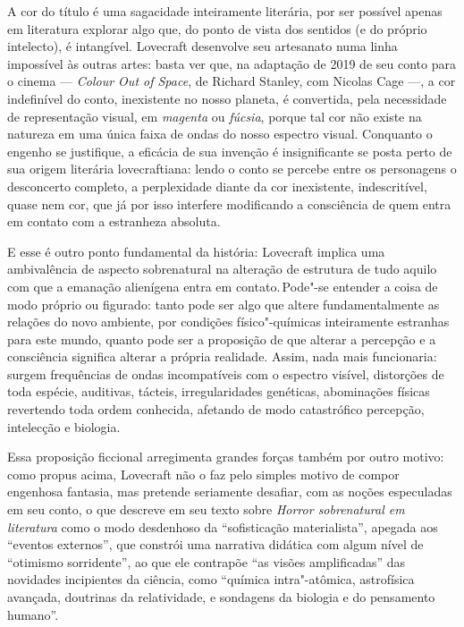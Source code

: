 A cor do título é uma sagacidade inteiramente literária, por ser
possível apenas em literatura explorar algo que, do ponto de vista dos
sentidos (e do próprio intelecto), é intangível. Lovecraft desenvolve
seu artesanato numa linha impossível às outras artes: basta ver que, na
adaptação de 2019 de seu conto para o cinema --- \textit{Colour Out of
Space}, de Richard Stanley, com Nicolas Cage ---, a cor indefinível do
conto, inexistente no nosso planeta, é convertida, pela necessidade de
representação visual, em \textit{magenta} ou \textit{fúcsia}, porque tal cor
não existe na natureza em uma única faixa de ondas do nosso espectro
visual. Conquanto o engenho se justifique, a eficácia de sua invenção é
insignificante se posta perto de sua origem literária lovecraftiana:
lendo o conto se percebe entre os personagens o desconcerto completo, a
perplexidade diante da cor inexistente, indescritível, quase nem cor,
que já por isso interfere modificando a consciência de quem entra em
contato com a estranheza absoluta.

E esse é outro ponto fundamental da história: Lovecraft implica uma
ambivalência de aspecto sobrenatural na alteração de estrutura de tudo
aquilo com que a emanação alienígena entra em contato.\,Pode"-se entender
a coisa de modo próprio ou figurado: tanto pode ser algo que altere
fundamentalmente as relações do novo ambiente, por condições
físico"-químicas inteiramente estranhas para este mundo, quanto pode ser
a proposição de que alterar a percepção e a consciência significa
alterar a própria realidade. Assim, nada mais funcionaria: surgem
frequências de ondas incompatíveis com o espectro visível, distorções de
toda espécie, auditivas, tácteis, irregularidades genéticas, abominações
físicas revertendo toda ordem conhecida, afetando de modo catastrófico
percepção, intelecção e biologia.

Essa proposição ficcional arregimenta grandes forças também por outro
motivo: como propus acima, Lovecraft não o faz pelo simples motivo de
compor engenhosa fantasia, mas pretende seriamente desafiar, com as
noções especuladas em seu conto, o que descreve em seu texto sobre
\textit{Horror sobrenatural em literatura} como o modo desdenhoso da
``sofisticação materialista'', apegada aos ``eventos externos'', que
constrói uma narrativa didática com algum nível de ``otimismo
sorridente'', ao que ele contrapõe ``as visões amplificadas'' das
novidades incipientes da ciência, como ``química intra"-atômica,
astrofísica avançada, doutrinas da relatividade, e sondagens da biologia
e do pensamento humano''.

